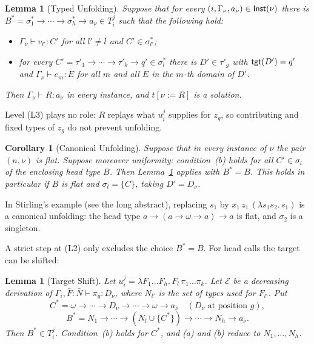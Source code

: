 \documentclass[10pt,a4paper]{article}
\theoremstyle{plain}%
\newtheorem{lemma}[theorem]{Lemma}
\newtheorem{corollary}[theorem]{Corollary}
\begin{document}
\begin{lemma}[Typed Unfolding]\label{lem:fifth-unfold}
Suppose that for every $(i,\Gamma_\nu,a_\nu) \in \mathsf{Inst}(\nu)$ there is $B^* = \sigma^*_1 \to \cdots \to \sigma^*_h \to a_\nu \in T_i^j$ such that the following hold:
\begin{itemize}
\item[(a)] $\Gamma_\nu \vdash v_{l'} : C'$ for all $l' \neq l$ and $C' \in \sigma^*_{l'}$;
\item[(b)] for every $C' = \tau'_1 \to \cdots \to \tau'_k \to q' \in \sigma^*_l$ there is $D' \in \tau'_g$ with $\mathsf{tgt}(D') = q'$ and $\Gamma_\nu \vdash e_m : E$ for all $m$ and all $E$ in the $m$-th domain of $D'$.
\end{itemize}
Then $\Gamma_\nu \vdash R : a_\nu$ in every instance, and $t[\nu := R]$ is a solution.
\end{lemma}

Level (L3) plays no role: $R$ replays what $u_i^j$ supplies for $z_g$, so contributing and fixed types of $z_g$ do not prevent unfolding.

\begin{corollary}[Canonical Unfolding]\label{cor:fifth-canon}
Suppose that in every instance of $\nu$ the pair $(n,\nu)$ is flat.
Suppose moreover \emph{uniformity}: condition~(b) holds for all $C' \in \sigma_l$ of the enclosing head type $B$.
Then Lemma~\ref{lem:fifth-unfold} applies with $B^* = B$.
This holds in particular if $B$ is flat and $\sigma_l = \{C\}$, taking $D' = D_\nu$.
\end{corollary}

In Stirling's example (see the long abstract), replacing $s_1$ by $x_1\,z_1\,(\lambda s_1 s_2.\,s_1)$ is a canonical unfolding: the head type $a \to (a \to \omega \to a) \to a$ is flat, and $\sigma_2$ is a singleton.

A strict step at (L2) only excludes the choice $B^* = B$.
For head calls the target can be shifted:

\begin{lemma}[Target Shift]\label{lem:fifth-shift}
Let $u_i^j = \lambda F_1\ldots F_h.\,F_l\,\pi_1\ldots\pi_k$.
Let $\mathcal{E}$ be a decreasing derivation of $\Gamma_i, \bar F : \bar N \vdash \pi_g : D_\nu$, where $N_{l'}$ is the set of types used for $F_{l'}$.
Put
\[
C^* = \omega \to \cdots \to D_\nu \to \cdots \to \omega \to a_\nu \quad (D_\nu \text{ at position } g),
\]
\[
B^* = N_1 \to \cdots \to (N_l \cup \{C^*\}) \to \cdots \to N_h \to a_\nu .
\]
Then $B^* \in T_i^j$.
Condition~(b) holds for $C^*$, and (a) and (b) reduce to $N_1, \ldots, N_h$.
\end{lemma}
\end{document}
